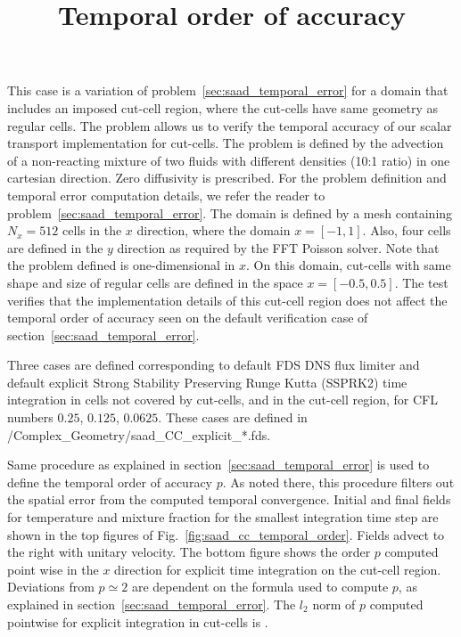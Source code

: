 \documentclass[11pt]{book}
\begin{document}
\label{sec:saad_cc_temporal_error}

This case is a variation of problem~\ref{sec:saad_temporal_error} for a domain that includes an imposed cut-cell region, where the cut-cells have same geometry as regular cells. The problem allows us to verify the temporal accuracy of our scalar transport implementation for cut-cells. The problem is defined by the advection of a non-reacting mixture of two fluids with different densities (10:1 ratio) in one cartesian direction. Zero diffusivity is prescribed. For the problem definition and temporal error computation details, we refer the reader to problem~\ref{sec:saad_temporal_error}.
The domain is defined by a mesh containing $N_x=512$ cells in the $x$ direction, where the domain $x=[-1,1]$. Also, four cells are defined in the $y$ direction as required by the FFT Poisson solver. Note that the problem defined is one-dimensional in $x$.
On this domain, cut-cells with same shape and size of regular cells are defined in the space $x=[-0.5,0.5]$. The test verifies that the implementation details of this cut-cell region does not affect the temporal order of accuracy seen on the default verification case of section~\ref{sec:saad_temporal_error}.

\title{Temporal order of accuracy}

Three cases are defined corresponding to default FDS DNS flux limiter and default explicit Strong Stability Preserving Runge Kutta (SSPRK2) time integration in cells not covered by cut-cells, and in the cut-cell region, for CFL numbers $0.25$, $0.125$, $0.0625$. These cases are defined in {\ct /Complex\_Geometry/saad\_CC\_explicit\_*.fds}.

Same procedure as explained in section~\ref{sec:saad_temporal_error} is used to define the temporal order of accuracy $p$. As noted there, this procedure filters out the spatial error from the computed temporal convergence. Initial and final fields for temperature and mixture fraction for the smallest integration time step are shown in the top figures of Fig.~\ref{fig:saad_cc_temporal_order}. Fields advect to the right with unitary velocity. The bottom figure shows the order $p$ computed point wise in the $x$ direction for explicit time integration on the cut-cell region. Deviations from $p \simeq 2$ are dependent on the formula used to compute $p$, as explained in section~\ref{sec:saad_temporal_error}.
The $l_2$ norm of $p$ computed pointwise for explicit integration in cut-cells is \!.
\end{document}
